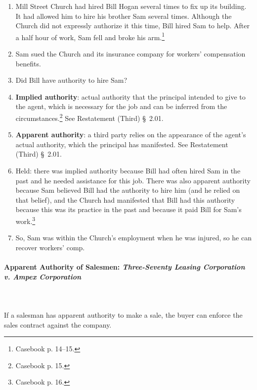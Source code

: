 \begin{enumerate}
    \item Mill Street Church had hired Bill Hogan several times to fix up its 
    building. It had allowed him to hire his brother Sam several times. 
    Although the Church did not expressly authorize it this time, Bill hired 
    Sam to help. After a half hour of work, Sam fell and broke his 
    arm.\footnote{Casebook p. 14--15.}
    \item Sam sued the Church and its insurance company for workers' 
    compensation benefits.
    \item Did Bill have authority to hire Sam?
    \item \textbf{Implied authority}: actual authority that the principal 
    intended to give to the agent, which is necessary for the job and can be 
    inferred from the circumstances.\footnote{Casebook p. 15.} See 
    Restatement (Third) \S\ 2.01.
    \item \textbf{Apparent authority}: a third party relies on the appearance 
    of the agent's actual authority, which the principal has manifested. See 
    Restatement (Third) \S\ 2.01.
    \item Held: there was implied authority because Bill had often hired Sam 
    in the past and he needed assistance for this job. There was also apparent 
    authority because Sam believed Bill had the authority to hire him (and he 
    relied on that belief), and the Church had manifested that Bill had this 
    authority because this was its practice in the past and because it paid 
    Bill for Sam's work.\footnote{Casebook p. 16.}
    \item So, Sam was within the Church's employment when he was injured, so 
    he can recover workers' comp.
\end{enumerate}

\paragraph{Apparent Authority of Salesmen: \emph{Three-Seventy Leasing 
Corporation v. Ampex Corporation}}
~\\\\

If a salesman has apparent authority to make a sale, the buyer can enforce the 
sales contract against the company.

